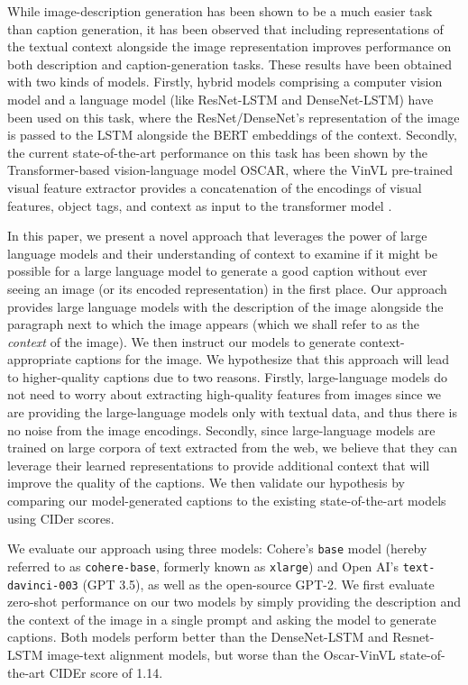 \documentclass[11pt]{article}
\begin{document}
While image-description generation has been shown to be a much easier task than caption generation, it has been observed that including representations of the textual context alongside the image representation improves performance on both description and caption-generation tasks. These results have been obtained with two kinds of models. Firstly, hybrid models comprising a computer vision model and a language model (like ResNet-LSTM and DenseNet-LSTM) have been used on this task, where the ResNet/DenseNet's representation of the image is passed to the LSTM alongside the BERT embeddings of the context. Secondly, the current state-of-the-art performance on this task has been shown by the Transformer-based vision-language model OSCAR, where the VinVL pre-trained visual feature extractor provides a concatenation of the encodings of visual features, object tags, and context as input to the transformer model \citep{kreiss2021concadia}.

In this paper, we present a novel approach that leverages the power of large language models and their understanding of context to examine if it might be possible for a large language model to generate a good caption without ever seeing an image (or its encoded representation) in the first place. Our approach provides large language models with the description of the image alongside the paragraph next to which the image appears (which we shall refer to as the \textit{context} of the image). We then instruct our models to generate context-appropriate captions for the image. We hypothesize that this approach will lead to higher-quality captions due to two reasons. Firstly, large-language models do not need to worry about extracting high-quality features from images since we are providing the large-language models only with textual data, and thus there is no noise from the image encodings. Secondly, since large-language models are trained on large corpora of text extracted from the web, we believe that they can leverage their learned representations to provide additional context that will improve the quality of the captions. We then validate our hypothesis by comparing our model-generated captions to the existing state-of-the-art models using CIDer scores.

We evaluate our approach using three models: Cohere's \texttt{base} model (hereby referred to as \texttt{cohere-base}, formerly known as \texttt{xlarge}) and Open AI's \texttt{text-davinci-003} (GPT 3.5), as well as the open-source GPT-2. We first evaluate zero-shot performance on our two models by simply providing the description and the context of the image in a single prompt and asking the model to generate captions. Both models perform better than the DenseNet-LSTM and Resnet-LSTM image-text alignment models, but worse than the Oscar-VinVL state-of-the-art CIDEr score of 1.14.
\end{document}

